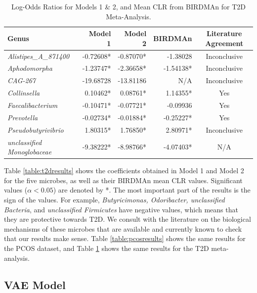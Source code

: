 \documentclass[12pt,letterpaper]{article}
\begin{document}
\begin{table}
        \centering
        \begin{tabular}{l r r r c}
          \toprule
          \textbf{Genus} & \textbf{Model 1} & \textbf{Model 2} & \textbf{BIRDMAn} & \textbf{Literature Agreement} \\
          \midrule
          \textit{Alistipes\_A\_871400} & -0.72608* & -0.87070* & -1.38028 & Inconclusive \\
          \textit{Aphodomorpha} & -1.23747* & -2.36658* & -1.54138* & Inconclusive \\
          \textit{CAG-267} & -19.68728 & -13.81186 & N/A & Inconclusive \\
          \textit{Collinsella} & 0.10462* & 0.08761* & 1.14355* & Yes \\
          \textit{Faecalibacterium} & -0.10471* & -0.07721* & -0.09936 & Yes \\
          \textit{Prevotella} & -0.02734* & -0.01884* & -0.25227* & Yes \\
          \textit{Pseudobutyrivibrio} & 1.80315* & 1.76850* & 2.80971* & Inconclusive \\
          \textit{unclassified Monoglobaceae} & -9.38222* & -8.98766* & -4.07403* & N/A \\
          \bottomrule
        \end{tabular}
        \caption{Log-Odds Ratios for Models 1 \& 2, and Mean CLR from BIRDMAn for T2D Meta-Analysis.}
        \label{table:sam-t2dresults}
      \end{table}


Table \ref{table:t2dresults} shows the coefficients obtained in Model 1 and Model 2 for the five microbes, as well as their BIRDMAn mean CLR values. Significant values ($\alpha < 0.05$) are denoted by *. The most important part of the results is the sign of the values. For example, \textit{Butyricimonas, Odoribacter, unclassified Bacteria}, and \textit{unclassified Firmicutes} have negative values, which means that they are protective towards T2D. We consult with the literature on the biological mechanisms of these microbes that are available and currently known to check that our results make sense. Table \ref{table:pcosresults} shows the same results for the PCOS dataset, and Table \ref{table:sam-t2dresults} shows the same results for the T2D meta-analysis. 

\subsection{VAE Model}
\end{document}
